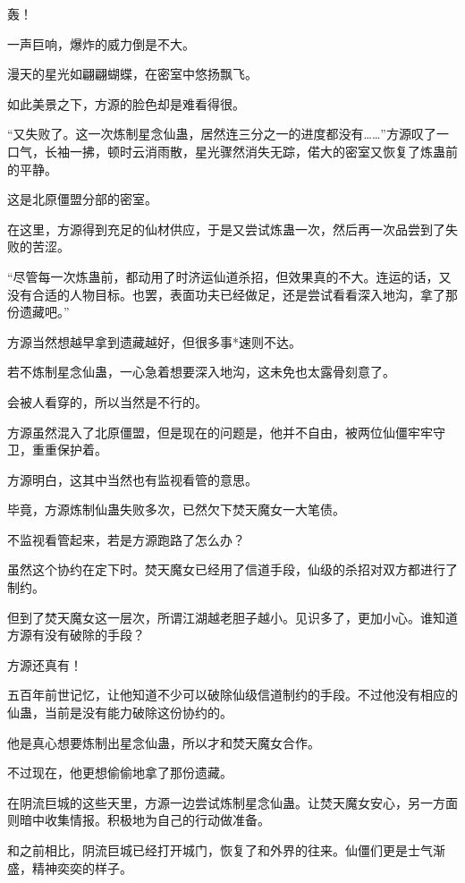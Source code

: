
\begin{this_body}

轰！

一声巨响，爆炸的威力倒是不大。

漫天的星光如翩翩蝴蝶，在密室中悠扬飘飞。

如此美景之下，方源的脸色却是难看得很。

“又失败了。这一次炼制星念仙蛊，居然连三分之一的进度都没有……”方源叹了一口气，长袖一拂，顿时云消雨散，星光骤然消失无踪，偌大的密室又恢复了炼蛊前的平静。

这是北原僵盟分部的密室。

在这里，方源得到充足的仙材供应，于是又尝试炼蛊一次，然后再一次品尝到了失败的苦涩。

“尽管每一次炼蛊前，都动用了时济运仙道杀招，但效果真的不大。连运的话，又没有合适的人物目标。也罢，表面功夫已经做足，还是尝试看看深入地沟，拿了那份遗藏吧。”

方源当然想越早拿到遗藏越好，但很多事*速则不达。

若不炼制星念仙蛊，一心急着想要深入地沟，这未免也太露骨刻意了。

会被人看穿的，所以当然是不行的。

方源虽然混入了北原僵盟，但是现在的问题是，他并不自由，被两位仙僵牢牢守卫，重重保护着。

方源明白，这其中当然也有监视看管的意思。

毕竟，方源炼制仙蛊失败多次，已然欠下焚天魔女一大笔债。

不监视看管起来，若是方源跑路了怎么办？

虽然这个协约在定下时。焚天魔女已经用了信道手段，仙级的杀招对双方都进行了制约。

但到了焚天魔女这一层次，所谓江湖越老胆子越小。见识多了，更加小心。谁知道方源有没有破除的手段？

方源还真有！

五百年前世记忆，让他知道不少可以破除仙级信道制约的手段。不过他没有相应的仙蛊，当前是没有能力破除这份协约的。

他是真心想要炼制出星念仙蛊，所以才和焚天魔女合作。

不过现在，他更想偷偷地拿了那份遗藏。

在阴流巨城的这些天里，方源一边尝试炼制星念仙蛊。让焚天魔女安心，另一方面则暗中收集情报。积极地为自己的行动做准备。

和之前相比，阴流巨城已经打开城门，恢复了和外界的往来。仙僵们更是士气渐盛，精神奕奕的样子。


\end{this_body}
